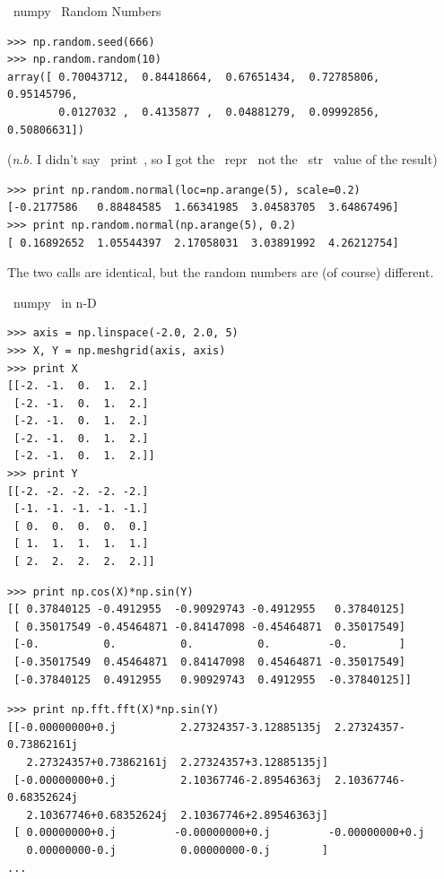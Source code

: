\documentclass[10pt, t]{beamer}
\let\verb=\codeDelimTwiddles
\begin{document}
\begin{frame}[fragile,label=sec-3-29]{\verb~numpy~ Random Numbers}
 \pause
\lstset{language=Python,label= ,caption= ,numbers=none}
\begin{lstlisting}
>>> np.random.seed(666)
>>> np.random.random(10)
array([ 0.70043712,  0.84418664,  0.67651434,  0.72785806,  0.95145796,
        0.0127032 ,  0.4135877 ,  0.04881279,  0.09992856,  0.50806631])
\end{lstlisting}
(\emph{n.b.} I didn't say \verb~print~, so I got the \verb~repr~ not the \verb~str~ value of the result)
\pause
\lstset{language=Python,label= ,caption= ,numbers=none}
\begin{lstlisting}
>>> print np.random.normal(loc=np.arange(5), scale=0.2)
[-0.2177586   0.88484585  1.66341985  3.04583705  3.64867496]
>>> print np.random.normal(np.arange(5), 0.2)
[ 0.16892652  1.05544397  2.17058031  3.03891992  4.26212754]
\end{lstlisting}
The two calls are identical, but the random numbers are (of course) different.
\end{frame}
\begin{frame}[fragile,label=sec-3-30]{\verb~numpy~ in n-D}
 \pause
\lstset{language=Python,label= ,caption= ,numbers=none}
\begin{lstlisting}
>>> axis = np.linspace(-2.0, 2.0, 5)
>>> X, Y = np.meshgrid(axis, axis)
>>> print X
[[-2. -1.  0.  1.  2.]
 [-2. -1.  0.  1.  2.]
 [-2. -1.  0.  1.  2.]
 [-2. -1.  0.  1.  2.]
 [-2. -1.  0.  1.  2.]]
>>> print Y
[[-2. -2. -2. -2. -2.]
 [-1. -1. -1. -1. -1.]
 [ 0.  0.  0.  0.  0.]
 [ 1.  1.  1.  1.  1.]
 [ 2.  2.  2.  2.  2.]]
\end{lstlisting}
\pause
\lstset{language=Python,label= ,caption= ,numbers=none}
\begin{lstlisting}
>>> print np.cos(X)*np.sin(Y)
[[ 0.37840125 -0.4912955  -0.90929743 -0.4912955   0.37840125]
 [ 0.35017549 -0.45464871 -0.84147098 -0.45464871  0.35017549]
 [-0.          0.          0.          0.         -0.        ]
 [-0.35017549  0.45464871  0.84147098  0.45464871 -0.35017549]
 [-0.37840125  0.4912955   0.90929743  0.4912955  -0.37840125]]
\end{lstlisting}
\pause
\lstset{language=Python,label= ,caption= ,numbers=none}
\begin{lstlisting}
>>> print np.fft.fft(X)*np.sin(Y)
[[-0.00000000+0.j          2.27324357-3.12885135j  2.27324357-0.73862161j
   2.27324357+0.73862161j  2.27324357+3.12885135j]
 [-0.00000000+0.j          2.10367746-2.89546363j  2.10367746-0.68352624j
   2.10367746+0.68352624j  2.10367746+2.89546363j]
 [ 0.00000000+0.j         -0.00000000+0.j         -0.00000000+0.j
   0.00000000-0.j          0.00000000-0.j        ]
...
\end{lstlisting}
\end{frame}
\end{document}
